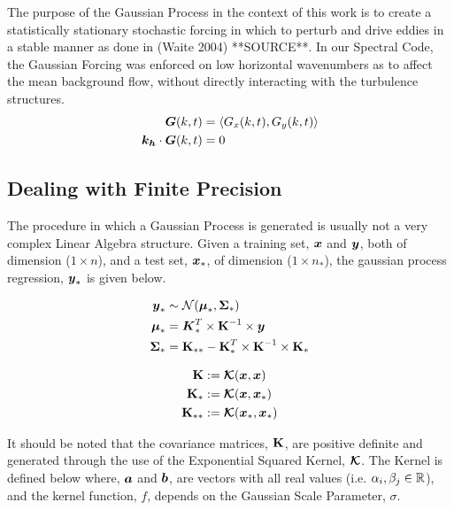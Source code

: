 \documentclass{article}
\begin{document}
The purpose of the Gaussian Process in the context of this work is to create a statistically stationary stochastic forcing in which to perturb and drive eddies in a stable manner as done in (Waite 2004) **SOURCE**. In our Spectral Code, the Gaussian Forcing was enforced on low horizontal wavenumbers as to affect the mean background flow, without directly interacting with the turbulence structures.
\begin{align*}
    \boldsymbol{G}(k, t) &= \left<G_x(k, t), G_y(k, t)\right> \\
    \boldsymbol{k_h} \cdot  \boldsymbol{G}(k, t) &= 0
\end{align*}

\subsection{Dealing with Finite Precision}
The procedure in which a Gaussian Process is generated is usually not a very complex Linear Algebra structure. Given a training set, $\boldsymbol{x}$ and $\boldsymbol{y}$, both of dimension ($1 \times n$), and a test set, $\boldsymbol{x}_*$, of dimension ($1 \times n_*$), the gaussian process regression, $\boldsymbol{y}_*$ is given below.

\begin{minipage}{.45\textwidth}
\begin{align*}
    \boldsymbol{y}_* &\sim \mathcal{N}(\boldsymbol{\mu}_*, \boldsymbol{\Sigma}_*) \\
    \boldsymbol{\mu}_* &= \boldsymbol{K}_*^T \times \boldsymbol{\mathrm{K}}^{-1} \times \boldsymbol{y} \\
    \boldsymbol{\Sigma}_* &= \boldsymbol{\mathrm{K}}_{**} - \boldsymbol{\mathrm{K}}_*^T \times \boldsymbol{\mathrm{K}}^{-1} \times \boldsymbol{\mathrm{K}}_*
\end{align*}
\end{minipage}
\begin{minipage} {.45\textwidth}
\begin{align*}
    \boldsymbol{\mathrm{K}} &:= \boldsymbol{\mathcal{K}}(\boldsymbol{x}, \boldsymbol{x}) \\
    \boldsymbol{\mathrm{K}}_* &:= \boldsymbol{\mathcal{K}}(\boldsymbol{x}, \boldsymbol{x}_*) \\
    \boldsymbol{\mathrm{K}}_{**} &:= \boldsymbol{\mathcal{K}}(\boldsymbol{x}_*, \boldsymbol{x}_*)
\end{align*}
\end{minipage}


It should be noted that the covariance matrices, $\boldsymbol{\mathrm{K}}$, are positive definite and generated through the use of the Exponential Squared Kernel, $\boldsymbol{\mathcal{K}}$. The Kernel is defined below where, $\boldsymbol{a}$ and $\boldsymbol{b}$, are vectors with all real values (i.e. $\alpha_i, \beta_j \in \mathbb{R}$), and the kernel function, $f$, depends on the Gaussian Scale Parameter, $\sigma$. 
\end{document}
